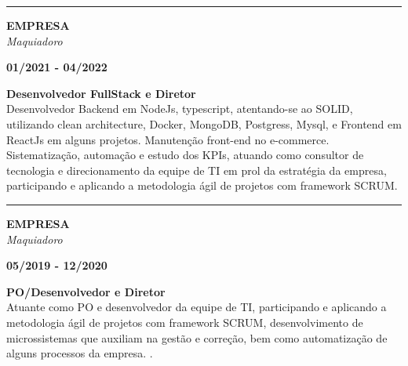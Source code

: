 \documentclass[12pt, a4paper]{article}
\newcommand{\LlinhaM}{1pt} 	 %
\newcommand{\TlinhaM}{17cm}		 %
\begin{document}
\begin{center} %
	\rule{\TlinhaM}{\LlinhaM}
\end{center}

\begin{multicols}{2}
	\begin{flushleft}
		\textbf{EMPRESA}\\
		\textit{Maquiadoro}\\
	\end{flushleft}
	\vfill
	\begin{flushright}
		\textbf{01/2021 - 04/2022}\\
	\end{flushright}
\end{multicols}
\begin{flushleft}
	\textbf{Desenvolvedor FullStack e Diretor}\\
	Desenvolvedor Backend em NodeJs, typescript, atentando-se ao SOLID, utilizando clean architecture, Docker, MongoDB, Postgress, Mysql,
	e Frontend em ReactJs em alguns projetos. Manutenção front-end no e-commerce.
	Sistematização, automação e estudo dos KPIs, atuando como consultor de tecnologia e direcionamento da equipe de TI em prol da estratégia da empresa,
	participando e aplicando a metodologia ágil de projetos com framework SCRUM.
\end{flushleft}

\begin{center} %
	\rule{\TlinhaM}{\LlinhaM}
\end{center}

\begin{multicols}{2}
	\begin{flushleft}
		\textbf{EMPRESA}\\
		\textit{Maquiadoro}\\
	\end{flushleft}
	\vfill
	\begin{flushright}
		\textbf{05/2019 - 12/2020}\\
	\end{flushright}
\end{multicols}
\begin{flushleft}
	\textbf{PO/Desenvolvedor e Diretor}\\
	Atuante como PO e desenvolvedor da equipe de TI, participando e aplicando a metodologia ágil de projetos com framework SCRUM,
	desenvolvimento de microssistemas que auxiliam na gestão e correção, bem como automatização de alguns processos da empresa.
	.
\end{flushleft}
\end{document}
